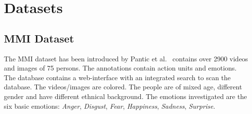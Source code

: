 \section{Datasets}
\label{sec:datasets}
\newcommand{\mmiColWidth}{0.15\columnwidth}
\newcommand{\hspacing}{15mm}
\subsection{MMI Dataset}
\label{sec:mmi}
The MMI dataset has been introduced by Pantic et al.~\cite{Pantic2005wdffe} contains over 2900 videos and images of 75 persons.
The annotations contain action units and emotions. The database contains a web-interface with an integrated search to scan the database. The videos/images are colored. The people are of mixed age, different gender and have different ethnical background.
The emotions investigated are the six basic emotions: \textit{Anger}, \textit{Disgust}, \textit{Fear}, \textit{Happiness}, \textit{Sadness}, \textit{Surprise}.


